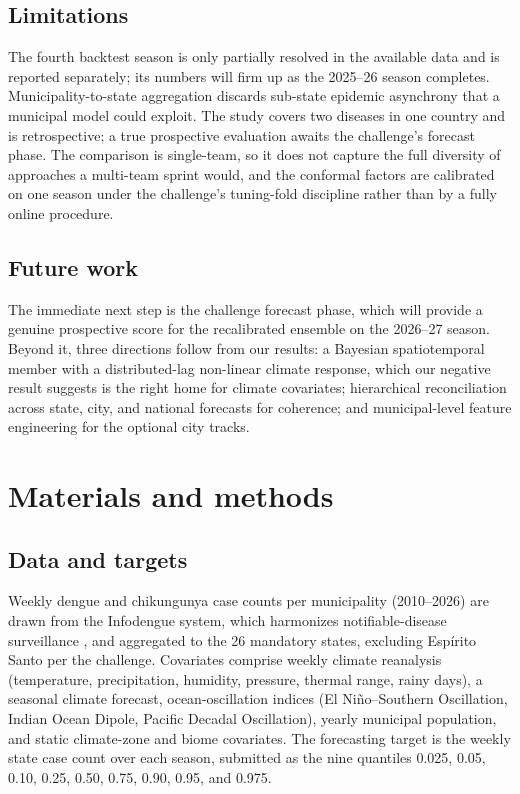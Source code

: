 \documentclass[11pt]{article}
\begin{document}
\subsection{Limitations}
The fourth backtest season is only partially resolved in the available data and is reported
separately; its numbers will firm up as the 2025--26 season completes. Municipality-to-state
aggregation discards sub-state epidemic asynchrony that a municipal model could exploit. The study
covers two diseases in one country and is retrospective; a true prospective evaluation awaits the
challenge's forecast phase. The comparison is single-team, so it does not capture the full diversity
of approaches a multi-team sprint would, and the conformal factors are calibrated on one season under
the challenge's tuning-fold discipline rather than by a fully online procedure.

\subsection{Future work}
The immediate next step is the challenge forecast phase, which will provide a genuine prospective
score for the recalibrated ensemble on the 2026--27 season. Beyond it, three directions follow from
our results: a Bayesian spatiotemporal member with a distributed-lag non-linear climate response,
which our negative result suggests is the right home for climate covariates; hierarchical
reconciliation across state, city, and national forecasts for coherence; and municipal-level feature
engineering for the optional city tracks.

\section{Materials and methods}\label{sec:methods}

\subsection{Data and targets}
Weekly dengue and chikungunya case counts per municipality (2010--2026) are drawn from the Infodengue
system, which harmonizes notifiable-disease surveillance \citep{codeco2018}, and aggregated to the 26
mandatory states, excluding Espírito Santo per the challenge. Covariates comprise weekly climate
reanalysis (temperature, precipitation, humidity, pressure, thermal range, rainy days), a seasonal
climate forecast, ocean-oscillation indices (El Ni\~no--Southern Oscillation, Indian Ocean Dipole,
Pacific Decadal Oscillation), yearly municipal population, and static climate-zone and biome
covariates. The forecasting target is the weekly state case count over each season, submitted as the
nine quantiles 0.025, 0.05, 0.10, 0.25, 0.50, 0.75, 0.90, 0.95, and 0.975.
\end{document}
